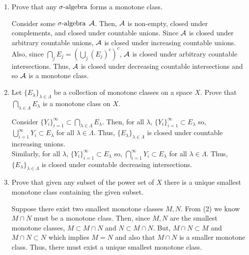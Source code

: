 \begin{enumerate}
\item Prove that any ${\sigma}\text{-algebra}$ forms a monotone class.
\begin{pf}
 Consider some ${\sigma}\text{-algebra}$ ${\mathcal A}$. Then, ${\mathcal A}$ is non-empty, closed under complements, and closed under countable unions. Since ${\mathcal A}$ is closed under arbitrary countable unions, ${\mathcal A}$ is closed under increasing countable unions. Also, since $\bigcap_j E_j = \left( \bigcup_j (E_j)^c \right)^c$, ${\mathcal A}$ is closed under arbitrary countable intersections. Thus, ${\mathcal A}$ is closed under decreasing countable intersections and so ${\mathcal A}$ is a monotone class. 
\end{pf}

\item Let $\{E_\lambda \}_{\lambda \in \Lambda}$ be a collection of monotone classes on a space $X$. Prove that $\bigcap_{\lambda \in \Lambda} E_\lambda$ is a monotone class on $X$.
\begin{pf}
Consider $\{Y_i \}_{i=1}^\infty \subset \bigcap_{\lambda \in \Lambda} E_{\lambda}$.  Then, for all $\lambda$,  $\{Y_i \}_{i=1}^\infty \subset  E_{\lambda}$ so,  $\bigcup_{i=1}^\infty Y_i \subset  E_{\lambda}$ for all $\lambda \in \Lambda$.  Thus, $\{E_\lambda \}_{\lambda \in \Lambda}$ is closed under countable increasing unions. \\
Similarly, for all $\lambda$,  $\{Y_i \}_{i=1}^\infty \subset  E_{\lambda}$ so,  $\bigcap_{i=1}^\infty Y_i \subset  E_{\lambda}$ for all $\lambda \in \Lambda$.  Thus, $\{E_\lambda \}_{\lambda \in \Lambda}$ is closed under countable decreasing intersections.
\end{pf}

\item Prove that given any subset of the power set of $X$ there is a unique smallest monotone class containing the given subset.
\begin{pf}
 Suppose there exist two smallest monotone classes $M, N$. From (2) we know $M \cap N$ must be a monotone class. Then, since $M,N$ are the smallest monotone classes, $M \subset M \cap N$ and $N \subset M \cap N$.  But, $M \cap N \subset M$ and $M \cap N \subset N$ which implies $M = N$ and also that $M \cap N$ is a smaller monotone class. Thus, there must exist a unique smallest monotone class. 
\end{pf}
	
\end{enumerate}
